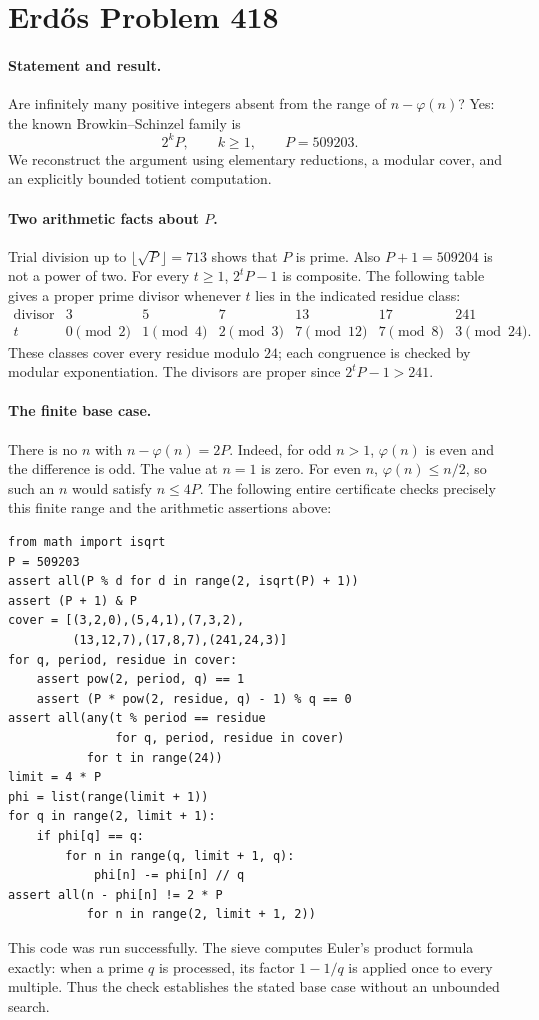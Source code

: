\section*{Erd\H{o}s Problem 418}

\paragraph{Statement and result.}
Are infinitely many positive integers absent from the range of
\(n-\varphi(n)\)? Yes: the known Browkin--Schinzel family is
\[
 2^kP,\qquad k\geq1,\qquad P=509203.
 \tag{1}
\]
We reconstruct the argument using elementary reductions, a modular
cover, and an explicitly bounded totient computation.

\paragraph{Two arithmetic facts about \(P\).}
Trial division up to \(\lfloor\sqrt P\rfloor=713\) shows that \(P\)
is prime. Also \(P+1=509204\) is not a power of two.
For every \(t\geq1\), \(2^tP-1\) is composite. The following table gives
a proper prime divisor whenever \(t\) lies in the indicated residue class:
\[
\begin{array}{c|rrrrrr}
\text{divisor}&3&5&7&13&17&241\\ \hline
t&0\pmod2&1\pmod4&2\pmod3&7\pmod{12}&7\pmod8&3\pmod{24}.
\end{array}
\tag{2}
\]
These classes cover every residue modulo \(24\); each congruence is
checked by modular exponentiation. The divisors are proper since
\(2^tP-1>241\).

\paragraph{The finite base case.}
There is no \(n\) with \(n-\varphi(n)=2P\).
Indeed, for odd \(n>1\), \(\varphi(n)\) is even and the difference is
odd. The value at \(n=1\) is zero. For even \(n\),
\(\varphi(n)\leq n/2\), so such an \(n\) would satisfy \(n\leq4P\).
The following entire certificate checks precisely this finite range
and the arithmetic assertions above:
\begin{verbatim}
from math import isqrt
P = 509203
assert all(P % d for d in range(2, isqrt(P) + 1))
assert (P + 1) & P
cover = [(3,2,0),(5,4,1),(7,3,2),
         (13,12,7),(17,8,7),(241,24,3)]
for q, period, residue in cover:
    assert pow(2, period, q) == 1
    assert (P * pow(2, residue, q) - 1) % q == 0
assert all(any(t % period == residue
               for q, period, residue in cover)
           for t in range(24))
limit = 4 * P
phi = list(range(limit + 1))
for q in range(2, limit + 1):
    if phi[q] == q:
        for n in range(q, limit + 1, q):
            phi[n] -= phi[n] // q
assert all(n - phi[n] != 2 * P
           for n in range(2, limit + 1, 2))
\end{verbatim}
This code was run successfully. The sieve computes Euler's product
formula exactly: when a prime \(q\) is processed, its factor
\(1-1/q\) is applied once to every multiple. Thus the check establishes
the stated base case without an unbounded search.

